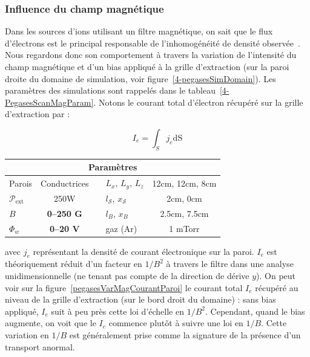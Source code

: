 \begin{refsection}
\subsubsection{Influence du champ magnétique}
Dans les sources d'ions utilisant un filtre magnétique, on sait que le flux
d'électrons est le principal responsable de l'inhomogénéité
de densité observée~\parencite{PIC2D,PIC3D}. Nous regardons donc son
comportement à travers la variation de l'intensité du champ magnétique et d'un
bias appliqué à la grille d'extraction (sur la paroi droite du domaine de
simulation, voir figure~\ref{4-pegasesSimDomain}).
Les paramètres des simulations sont rappelés dans le tableau~\ref{4-PegasesScanMagParam}.
Notons le courant total d'électron récupéré sur la grille d'extraction par :

\begin{equation}
I_e=\int_S j_e\text{dS}
\end{equation}
\begin{minipage}{\textwidth}
\footnotesize\centering
{}
\begin{tabular}{lcclc}\toprule
\multicolumn{5}{c}{\bf Paramètres}\\
\midrule 
Parois & Conductrices &&$L_x$, $L_y$, $L_z$  & 12cm, 12cm,
8cm\\
$\mathcal{P}_\text{ext}$&250W&&$l_\mathcal{S}$, $x_\mathcal{S}$&2cm, 0cm\\
$B$&\textbf{0--250 G}&&$l_B$, $x_B$&2.5cm, 7.5cm\\
$\Phi_w$ & \textbf{0--20 V}&&gaz (Ar) & 1 mTorr\\
\bottomrule
\end{tabular}
\label{4-PegasesScanMagParam}
\end{minipage}

avec $j_e$ représentant la densité de courant électronique sur la paroi. $I_e$
est théoriquement réduit d'un facteur en $1/B^2$ à travers le filtre dans une
analyse unidimensionnelle (ne tenant pas compte de la direction de dérive $y$).
On peut voir sur la figure~\ref{pegasesVarMagCourantParoi} le courant total
$I_e$ récupéré au niveau de la grille d'extraction (sur le bord droit du
domaine) : sans bias appliqué, $I_e$ suit à peu près cette loi d'échelle en
$1/B^2$. Cependant, quand le bias augmente, on voit que le $I_e$ commence plutôt
à suivre une loi en $1/B$. Cette variation en $1/B$ est généralement prise
comme la signature de la présence d'un transport anormal.


\end{refsection}
